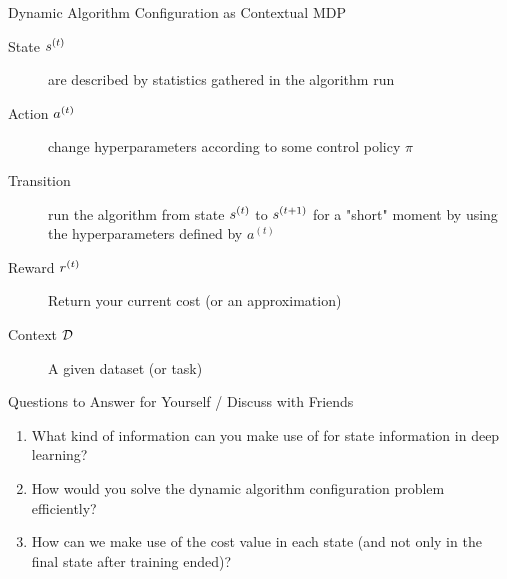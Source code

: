 \begin{frame}[c]{Dynamic Algorithm Configuration as Contextual MDP }


\begin{description}
	\item[State $s^{(t)}$] are described by statistics gathered in the algorithm run
	\pause
	\item[Action $a^{(t)}$] change hyperparameters according to some control policy $\pi$
	\pause
	\item[Transition] run the algorithm from state $s^{(t)}$ to $s^{(t+1)}$ for a "short" moment by using the hyperparameters defined by $a^{(t)}$
	\pause
	\item[Reward $r^{(t)}$] Return your current cost (or an approximation)
	\pause
	\item[Context $\mathcal{D}$] A given dataset (or task)
\end{description}

\bigskip
	
\centering

	
	
\end{frame}

\begin{frame}[c]{Questions to Answer for Yourself / Discuss with Friends}
    
    \begin{enumerate}
        \item What kind of information can you make use of for state information in deep learning?
        \item How would you solve the dynamic algorithm configuration problem efficiently?
        \item How can we make use of the cost value in each state (and not only in the final state after training ended)?
    \end{enumerate}
    
\end{frame}




